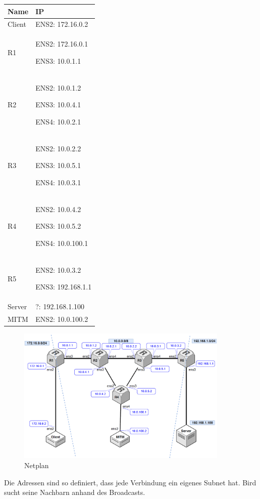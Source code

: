 \documentclass[11pt,titlepage]{article}
\begin{document}
\begin{tabular}{ |p{5cm}|p{9cm}|}
  \hline
  \textbf{Name} & \textbf{IP} \\
  \hline
  Client & ENS2: 172.16.0.2 \\
  \hline
  R1 & ENS2: 172.16.0.1 \par ENS3: 10.0.1.1 \\
  \hline
  R2 & ENS2: 10.0.1.2 \par ENS3: 10.0.4.1 \par ENS4: 10.0.2.1 \\
  \hline
  R3 & ENS2: 10.0.2.2 \par ENS3: 10.0.5.1 \par ENS4: 10.0.3.1 \\
  \hline
  R4 & ENS2: 10.0.4.2 \par ENS3: 10.0.5.2 \par ENS4: 10.0.100.1 \\
  \hline
  R5 & ENS2: 10.0.3.2 \par ENS3: 192.168.1.1 \\
  \hline
  Server & ?: 192.168.1.100 \\
  \hline
  MITM & ENS2: 10.0.100.2 \\
  \hline
\end{tabular}

\begin{figure}[H]
  \begin{center}
    \includegraphics[width=0.90\textwidth]{images/netplan.png}
    \caption{Netplan}
    \label{fig:Netplan}
  \end{center}
\end{figure}

Die Adressen sind so definiert, dass jede Verbindung ein eigenes Subnet hat. Bird sucht seine Nachbarn anhand des Broadcasts.
\end{document}
